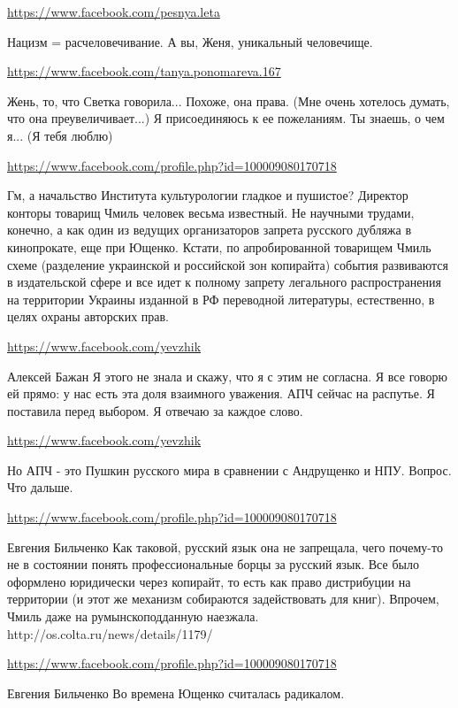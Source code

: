 \documentclass[a4paper,11pt]{extreport}
\begin{document}
\begin{itemize}
\url{https://www.facebook.com/pesnya.leta}

Нацизм = расчеловечивание. А вы, Женя, уникальный человечище.

\url{https://www.facebook.com/tanya.ponomareva.167}

Жень, то, что Светка говорила... Похоже, она права. (Мне очень хотелось думать, что она преувеличивает...) Я присоединяюсь к ее пожеланиям. Ты знаешь, о чем я... (Я тебя люблю)

\url{https://www.facebook.com/profile.php?id=100009080170718}

Гм, а начальство Института культурологии гладкое и пушистое? Директор конторы товарищ Чмиль человек весьма известный. Не научными трудами, конечно, а как один из ведущих организаторов запрета русского дубляжа в кинопрокате, еще при Ющенко. Кстати, по апробированной товарищем Чмиль схеме (разделение украинской и российской зон копирайта) события развиваются в издательской сфере и все идет к полному запрету легального распространения на территории Украины изданной в РФ переводной литературы, естественно, в целях охраны авторских прав.

\begin{itemize}
\url{https://www.facebook.com/yevzhik}

Алексей Бажан Я этого не знала и скажу, что я с этим не согласна. Я все говорю ей прямо: у нас есть эта доля взаимного уважения. АПЧ сейчас на распутье. Я поставила перед выбором. Я отвечаю за каждое слово.

\url{https://www.facebook.com/yevzhik}

Но АПЧ - это Пушкин русского мира в сравнении с Андрущенко и НПУ. Вопрос. Что дальше.

\url{https://www.facebook.com/profile.php?id=100009080170718}

Евгения Бильченко Как таковой, русский язык она не запрещала, чего почему-то не в состоянии понять профессиональные борцы за русский язык. Все было оформлено юридически через копирайт, то есть как право дистрибуции на территории (и этот же механизм собираются задействовать для книг). Впрочем, Чмиль даже на румынскоподданную наезжала. http://os.colta.ru/news/details/1179/

\url{https://www.facebook.com/profile.php?id=100009080170718}

Евгения Бильченко Во времена Ющенко считалась радикалом.


\end{itemize}
\end{itemize}
\end{document}
